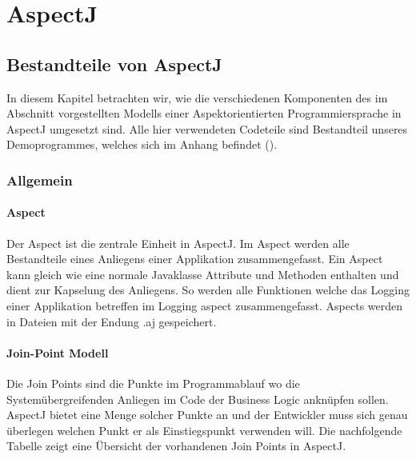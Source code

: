 \chapter{AspectJ}
\label{chap:aspectj}
\section{Bestandteile von AspectJ}
In diesem Kapitel betrachten wir, wie die verschiedenen Komponenten des im Abschnitt  vorgestellten Modells einer Aspektorientierten Programmiersprache in AspectJ umgesetzt sind. Alle hier verwendeten Codeteile sind Bestandteil unseres Demoprogrammes, welches sich im Anhang befindet ().

\subsection{Allgemein}
\subsubsection{Aspect}
Der Aspect ist die zentrale Einheit in AspectJ. Im Aspect werden alle Bestandteile eines Anliegens einer Applikation zusammengefasst. Ein Aspect kann gleich wie eine normale Javaklasse Attribute und Methoden enthalten und dient zur Kapselung des Anliegens. So werden alle Funktionen welche das Logging einer Applikation betreffen im Logging aspect zusammengefasst. Aspects werden in Dateien mit der Endung .aj gespeichert.


\subsubsection{Join-Point Modell}
Die Join Points sind die Punkte im Programmablauf wo die Systemübergreifenden Anliegen im Code der Business Logic anknüpfen sollen. AspectJ bietet eine Menge solcher Punkte an und der Entwickler muss sich genau überlegen welchen Punkt er als Einstiegspunkt verwenden will. Die nachfolgende Tabelle zeigt eine Übersicht der vorhandenen Join Points in AspectJ.

